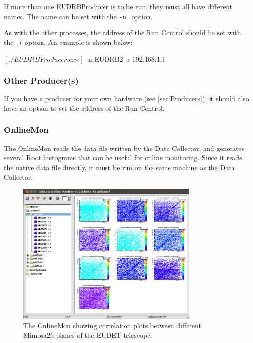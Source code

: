 If more than one EUDRBProducer is to be run, they must all have different names.
The name can be set with the \texttt{-n } option.

As with the other processes, the address of the Run Control should be set with the \texttt{-r} option.
An example is shown below:
\begin{listing}[mybash]
$[./EUDRBProducer.exe]$ -n EUDRB2 -r 192.168.1.1
\end{listing}

\subsubsection{Other Producer(s)}
If you have a producer for your own hardware (see \autoref{sec:Producers}),
it should also have an option to set the address of the Run Control.

\subsubsection{OnlineMon}

The OnlineMon reads the data file written by the Data Collector,
and generates several Root histograms that can be useful for online monitoring.
Since it reads the native data file directly, it must be run on the
same machine as the Data Collector.

\begin{figure}[htb]
  \begin{center}
    \includegraphics[width=0.8\textwidth]{src/images/OnlineMonCorrelations}
    \caption{The OnlineMon showing correlation plots between different
      Mimosa26 planes of the EUDET telescope.}
    \label{fig:OnlineMonPlots}
  \end{center}
\end{figure}


